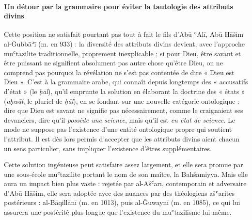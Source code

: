 \paragraph{Un détour par la grammaire pour éviter la tautologie des attributs divins}Cette position ne satisfait pourtant pas tout à fait le fils d'Abū ʿAlī,
Abū Ḥāšim al-Ǧubbāʾī (m. en 933) : la diversité des attributs divins
devient, avec l'approche muʿtazilite traditionnelle, proprement
inexplicable ; si pour Dieu, être savant et être puissant ne signifient
absolument pas autre chose qu'être Dieu, on ne comprend pas pourquoi la
révélation ne s'est pas contentée de dire « Dieu est Dieu ». C'est à la
grammaire arabe, qui connaît depuis longtemps des « accusatifs d'état »
(le \emph{ḥāl}), qu'il emprunte la solution en élaborant la doctrine des
« états » (\emph{aḥwāl}, le pluriel de \emph{ḥāl}), en se fondant sur
une nouvelle catégorie ontologique : dire que Dieu est savant ne
signifie pas nécessairement, comme le craignaient ses devanciers, dire
qu'il \emph{possède une science}, mais qu'il est \emph{en état de
science}. Le mode ne suppose pas l'existence d'une entité ontologique
propre qui soutient l'attribut. Il est dès lors permis d'accepter que
les attributs divins aient chacun un sens particulier, sans impliquer
l'existence d'êtres supplémentaires.

Cette solution ingénieuse peut satisfaire assez largement, et elle sera
promue par une sous-école muʿtazilite portant le nom de son maître, la
Bahšamiyya. Mais elle aura un impact bien plus vaste : rejetée par
al-Ašʿarī, contemporain et adversaire d'Abū Hāšim, elle sera adoptée
avec des nuances par des théologiens ašʿarites postérieurs :
al-Bāqillānī (m. en 1013), puis al-Ǧuwaynī (m. en 1085), ce qui lui
assurera une postérité plus longue que l'existence du muʿtazilisme
lui-même.

